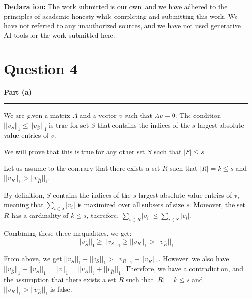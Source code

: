 \documentclass[a4paper,12pt]{article}
\title{\cooltitle{CS754 Assignment-2}}
\author{{\bf Saksham Rathi, Ekansh Ravi Shankar, Kshitij Vaidya}}
\date{}
\newenvironment{solution}[2][]{%
    \begin{mdframed}[linecolor=blue!70!black, linewidth=2pt, roundcorner=10pt, backgroundcolor=yellow!10!white, skipabove=12pt, skipbelow=12pt]%
        \textbf{\large #2}
        \par\noindent\rule{\textwidth}{0.4pt}
}{
    \end{mdframed}
}
\begin{document}
\maketitle
\textbf{Declaration:} The work submitted is our own, and
we have adhered to the principles of academic honesty while completing and submitting this work. We have not referred to any unauthorized sources, and we have not used generative AI tools for the work submitted here.

\section*{Question 4}

\begin{solution}{Part (a)}
  We are given a matrix $A$ and a vector $v$ such that $Av = 0$. The condition $||v_S||_1 \leq ||v_{\bar{S}}||_1$ is true for set $S$ that contains the indices of the $s$ largest absolute value entries of $v$. 

  We will prove that this is true for any other set $S$ such that $|S| \leq s$. 

  Let us assume to the contrary that there exists a set $R$ such that $|R| = k \leq s$ and $||v_R||_1 > ||v_{\bar{R}}||_1$.

  By definition, $S$ contains the indices of the $s$ largest absolute value entries of $v$, meaning that $\sum_{i\in S}|v_i|$ is maximized over all subsets of size $s$. Moreover, the set $R$ has a cardinality of $k \leq s$, therefore, $\sum_{i\in R}|v_i| \leq \sum_{i\in S}|v_i|$. 

  Combining these three inequalities, we get:
\begin{equation}
  ||v_{\bar{S}}||_1 \geq ||v_S||_1 \geq ||v_R||_1 > ||v_{\bar{R}}||_1
\end{equation}

From above, we get $||v_{\bar{S}}||_1 + ||v_S||_1 > ||v_R||_1 + ||v_{\bar{R}}||_1$. However, we also have $||v_{\bar{S}}||_1 + ||v_S||_1 = ||v||_1 = ||v_R||_1 + ||v_{\bar{R}}||_1$. Therefore, we have a contradiction, and the assumption that there exists a set $R$ such that $|R| = k \leq s$ and $||v_R||_1 > ||v_{\bar{R}}||_1$ is false.

\end{solution}
\end{document}
